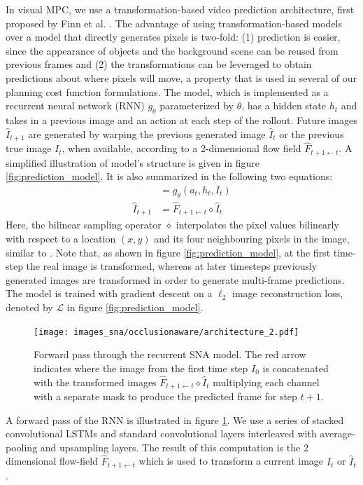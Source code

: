 In visual MPC, we use a transformation-based video prediction architecture, first proposed by Finn et al. \cite{finn_nips}. The advantage of using transformation-based models over a model that directly generates pixels is two-fold: (1) prediction is easier, since the appearance of objects and the background scene can be reused from previous frames and (2) the transformations can be leveraged to obtain predictions about where pixels will move, a property that is used in several of our planning cost function formulations. The model, which is implemented as a recurrent neural network (RNN) $g_{\theta}$ parameterized by $\theta$, has a hidden state $h_t$ and takes in a previous image and an action at each step of the rollout.  Future images $\hat{I}_{t+1}$ are generated by warping the previous generated image $\hat{I}_t$ or the previous true image $I_t$, when available, according to a 2-dimensional flow field $\hat{F}_{t+1 \leftarrow t}$. A simplified illustration of model's structure is given in figure \ref{fig:prediction_model}. It is also summarized in the following two equations:
\begin{align}
[h_{t+1}, \hat{F}_{t+1 \leftarrow t}] 	&= g_{\theta}(a_t, h_t, I_t) \\
\hat{I}_{t+1} 							&= \hat{F}_{t+1 \leftarrow t} \diamond  \hat{I}_t 
\label{simple_dna}
\end{align}
Here, the bilinear sampling operator $\diamond$ interpolates the pixel values bilinearly with respect to a location $(x,y)$ and its four neighbouring pixels in the image, similar to \cite{zhou2016view}. Note that, as shown in figure \ref{fig:prediction_model}, at the first time-step the real image is transformed, whereas at later timesteps previously generated images are transformed in order to generate multi-frame predictions. The model is trained with gradient descent on a $\ell_2$ image reconstruction loss, denoted by $\mathcal{L}$ in figure \ref{fig:prediction_model}.
\begin{figure}[t]
    \centering
    \texttt{[image: images\_sna/occlusionaware/architecture\_2.pdf]}
    \caption{\small{Forward pass through the recurrent SNA model. The red arrow indicates where the image from the first time step $I_0$ is concatenated with the transformed images $\hat{F}_{t+1 \leftarrow t} \diamond  \hat{I}_t $ multiplying each channel with a separate mask to produce the predicted frame for step $t+1$.}}      \label{fig:occlusion_model}
\end{figure}
A forward pass of the RNN is illustrated in figure \ref{fig:occlusion_model}. We use a series of stacked convolutional LSTMs and standard convolutional layers interleaved with average-pooling and upsampling layers. The result of this computation is the 2 dimensional flow-field $\hat{F}_{t+1 \leftarrow t}$ which is used to transform a current image $I_t$ or $\hat{I}_t$. 

